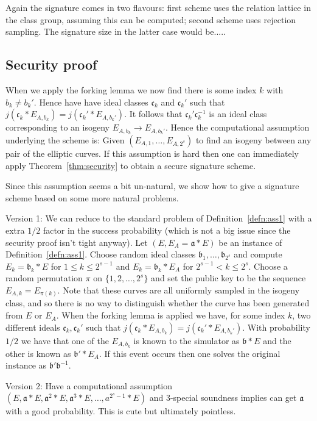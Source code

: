\documentclass{llncs}
\renewcommand{\a}{\mathfrak{a}}
\renewcommand{\b}{\mathfrak{b}}
\renewcommand{\c}{\mathfrak{c}}
\begin{document}
Again the signature comes in two flavours: first scheme uses the relation lattice in the class group, assuming this can be computed; second scheme uses rejection sampling.
The signature size in the latter case would be.....

\subsection{Security proof}

When we apply the forking lemma we now find there is some index $k$ with $b_k \ne b_k'$.
Hence have have ideal classes $\c_k$ and $\c_k'$ such that $j( \c_k * E_{A, b_k} ) = j( \c_k' * E_{A, b_k'})$. It follows that $\c_k' \c_k^{-1}$ is an ideal class corresponding to an isogeny $E_{A,b_k} \to E_{A,b_k'}$.
Hence the computational assumption underlying the scheme is:
Given $(E_{A,1}, \dots, E_{A,2^s} )$ to find an isogeny between any pair of the elliptic curves.
If this assumption is hard then one can immediately apply Theorem~\ref{thm:security} to obtain a secure signature scheme.

Since this assumption seems a bit un-natural, we show how to give a signature scheme based on some more natural problems.

Version 1: We can reduce to the standard problem of Definition~\ref{defn:ass1} with a extra $1/2$ factor in the success probability (which is not a big issue since the security proof isn't tight anyway).
Let $(E, E_A = \a * E )$ be an instance of Definition~\ref{defn:ass1}. Choose random ideal classes $\b_1, \dots, \b_{2^s}$ and compute $E_k = \b_k * E$ for $1 \le k \le 2^{s-1}$ and $E_k = \b_k * E_A$ for $2^{s-1} < k \le 2^s$. Choose a random permutation $\pi$ on $\{ 1, 2, \dots, 2^s \}$ and set the public key to be the sequence $E_{A,k} = E_{\pi(k)}$.
Note that these curves are all uniformly sampled in the isogeny class, and so there is no way to distinguish whether the curve has been generated from $E$ or $E_A$.
When the forking lemma is applied we have, for some index $k$, two different ideals $\c_k, \c_k'$ such that $j( \c_k * E_{A, b_k} ) = j( \c_k' * E_{A, b_k'})$.
With probability $1/2$ we have that one of the $E_{A,b_k}$ is known to the simulator as  $\b * E$ and the other is known as $\b' * E_A$. If this event occurs then one solves the original instance as $\b' \b^{-1}$.

Version 2: Have a computational assumption $(E, \a * E, \a^2 * E, \a^3 * E , \dots, a^{2^s - 1} * E )$ and 3-special soundness implies can get $\a$ with a good probability. This is cute but ultimately pointless.
\end{document}
